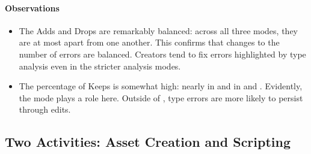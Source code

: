 \documentclass[english,submission,cleveref]{programming}
\begin{document}
\paragraph{Observations}

\begin{itemize}
  \item
    The Adds and Drops are remarkably balanced: across all three modes, they are
    at most  apart from one another.
    This confirms that changes to the number of errors are balanced.
    Creators tend to fix errors highlighted by type analysis
    even in the stricter analysis modes.

  \item
    The percentage of Keeps is somewhat high: nearly  in \mnocheck{}
    and  in \mnonstrict{} and \mstrict{}.
    Evidently, the mode plays a role here.
    Outside of \mnocheck{}, type errors are more likely to persist through edits.

\end{itemize}


\subsection{Two Activities: Asset Creation and Scripting}
\end{document}
